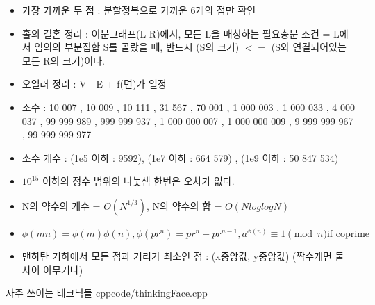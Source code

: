 \documentclass[landscape, 10pt, a4paper, oneside, twocolumn]{extarticle}
\begin{document}
\begin{itemize}
\item 가장 가까운 두 점 : 분할정복으로 가까운 6개의 점만 확인

\item 홀의 결혼 정리 : 이분그래프(L-R)에서, 모든 L을 매칭하는 필요충분 조건 = L에서 임의의 부분집합 S를 골랐을 때, 반드시 (S의 크기) $<=$ (S와 연결되어있는 모든 R의 크기)이다.

\item 오일러 정리 : V - E + f(면)가 일정

\item 소수 : 10 007 , 10 009 , 10 111 , 31 567 , 70 001 , 1 000 003 , 1 000 033 , 4 000 037 , 99 999 989 , 999 999 937 , 1 000 000 007 , 1 000 000 009 , 9 999 999 967 , 99 999 999 977

\item 소수 개수 : (1e5 이하 : 9592), (1e7 이하 : 664 579) , (1e9 이하 : 50 847 534) 

\item $10^{15}$ 이하의 정수 범위의 나눗셈 한번은 오차가 없다.

\item N의 약수의 개수 = $O(N^{1/3})$, N의 약수의 합 = $O(NloglogN)$

\item $\phi(mn) = \phi(m) \phi(n) , \phi(pr^n) = pr^n - pr^{n-1} , a^{\phi(n)} \equiv 1 \pmod{n} \text{if coprime}$

\item 맨하탄 기하에서 모든 점과 거리가 최소인 점 : (x중앙값, y중앙값) (짝수개면 둘 사이 아무거나)

\end{itemize}

\Algorithm
{자주 쓰이는 테크닉들}
{}
{}
{cpp}{code/thinkingFace.cpp}



\iffalse

\fi
\end{document}
